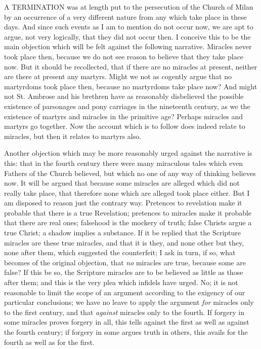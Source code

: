 A TERMINATION was at length put to the
persecution of the Church of Milan by an occurrence of a very
different nature from any which take place in these days. And since
such events as I am to mention do not occur now, we are apt to argue,
not very logically, that they did not occur then. I conceive this to
be the main objection which will be felt against the following
narrative. Miracles never took place then, because we do not see
reason to believe that they take place now. But it should be
recollected, that if there are no miracles at present, neither are
there at present any martyrs. Might we not as cogently argue that no
martyrdoms took place then, because no martyrdoms take place now? And
might not St. Ambrose and his brethren have as reasonably disbelieved
the possible existence of parsonages and pony carriages in the
nineteenth century, as we the existence of martyrs and miracles in the
primitive age? Perhaps miracles and martyrs go together. Now the
account which is to follow does indeed relate to miracles, but then it
relates to martyrs also.

Another objection which may be more reasonably urged against the
narrative is this: that in the fourth century there were many
miraculous tales which even Fathers of the Church believed, but which
no one of any way of thinking believes now. It will be argued that
because some miracles are alleged which did not really take
place, that therefore none which are alleged took place either. But I
am disposed to reason just the contrary way. Pretences to revelation
make it probable that there is a true Revelation; pretences to
miracles make it probable that there are real ones; falsehood is the
mockery of truth; false Christs argue a true Christ; a shadow implies
a substance. If it be replied that the Scripture miracles are these
true miracles, and that it is they, and none other but they, none
after them, which suggested the counterfeit; I ask in turn, if so,
what becomes of the original objection, that \emph{no} miracles are
true, because some are false? If this be so, the Scripture miracles
are to be believed as little as those after them; and this is the very
plea which infidels have urged. No; it is not reasonable to limit the
scope of an argument according to the exigency of our particular
conclusions; we have no leave to apply the argument \emph{for}
miracles only to the first century, and that \emph{against} miracles
only to the fourth. If forgery in some miracles proves forgery in all,
this tells against the first as well as against the fourth century; if
forgery in some argues truth in others, this avails for the fourth as
well as for the first.

